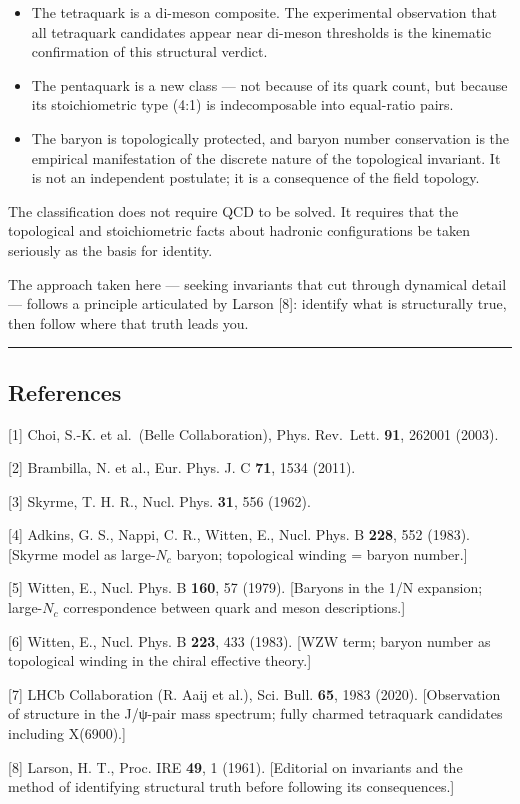 \begin{itemize}
\item
  The tetraquark is a di-meson composite. The experimental observation
  that all tetraquark candidates appear near di-meson thresholds is the
  kinematic confirmation of this structural verdict.
\item
  The pentaquark is a new class --- not because of its quark
  count, but because its stoichiometric type (4:1) is indecomposable
  into equal-ratio pairs.
\item
  The baryon is topologically protected, and baryon number conservation
  is the empirical manifestation of the discrete nature of the
  topological invariant. It is not an independent postulate; it is a
  consequence of the field topology.
\end{itemize}

The classification does not require QCD to be solved. It requires that
the topological and stoichiometric facts about hadronic configurations
be taken seriously as the basis for identity.

The approach taken here --- seeking invariants that cut through
dynamical detail --- follows a principle articulated by Larson {[}8{]}:
identify what is structurally true, then follow where that truth leads
you.

\begin{center}\rule{0.5\linewidth}{0.5pt}\end{center}

\hypertarget{references}{%
\subsection*{References}\label{references}}

{[}1{]} Choi, S.-K. et al.~(Belle Collaboration), Phys. Rev.~Lett.
\textbf{91}, 262001 (2003).

{[}2{]} Brambilla, N. et al., Eur. Phys. J. C \textbf{71}, 1534 (2011).

{[}3{]} Skyrme, T. H. R., Nucl. Phys. \textbf{31}, 556 (1962).

{[}4{]} Adkins, G. S., Nappi, C. R., Witten, E., Nucl. Phys. B
\textbf{228}, 552 (1983). {[}Skyrme model as large-\(N_c\) baryon;
topological winding = baryon number.{]}

{[}5{]} Witten, E., Nucl. Phys. B \textbf{160}, 57 (1979). {[}Baryons in
the 1/N expansion; large-\(N_c\) correspondence between quark and meson
descriptions.{]}

{[}6{]} Witten, E., Nucl. Phys. B \textbf{223}, 433 (1983). {[}WZW term;
baryon number as topological winding in the chiral effective theory.{]}

{[}7{]} LHCb Collaboration (R. Aaij et al.), Sci. Bull. \textbf{65},
1983 (2020). {[}Observation of structure in the J/ψ-pair mass spectrum;
fully charmed tetraquark candidates including X(6900).{]}

{[}8{]} Larson, H. T., Proc. IRE \textbf{49}, 1 (1961). {[}Editorial on
invariants and the method of identifying structural truth
before following its consequences.{]}
